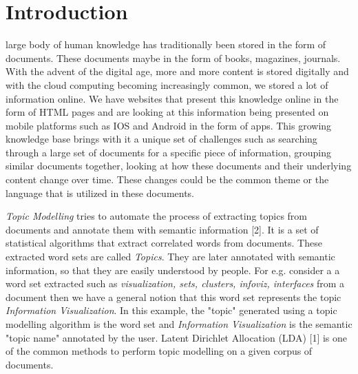 \documentclass[10pt,journal,compsoc]{IEEEtran}
\begin{document}
\ifCLASSOPTIONcompsoc
{}
\else
\section{Introduction}
\label{sec:introduction}
\fi

 large body of human knowledge has traditionally been stored in the form of documents. These documents maybe in the form of books, magazines, journals. With the advent of the digital age, more and more content is stored digitally and with the cloud computing becoming increasingly common, we stored a lot of information online. We have websites that present this knowledge online in the form of HTML pages and are looking at this information being presented on mobile platforms such as IOS and Android in the form of apps. This growing knowledge base brings with it a unique set of challenges such as searching through a large set of documents for a specific piece of information, grouping similar documents together, looking at how these documents and their underlying content change over time. These changes could be the common theme or the language that is utilized in these documents.

\textit{Topic Modelling} tries to automate the process of extracting topics from documents and annotate them with semantic information [2]. It is a set of statistical algorithms that extract correlated words from documents. These extracted word sets are called \textit{Topics}. They are later annotated with semantic information, so that they are easily understood by people. For e.g. consider a a word set extracted such as \textit{visualization, sets, clusters, infoviz, interfaces} from a document then we have a general notion that this word set represents the topic \textit{Information Visualization}. In this example, the "topic" generated using a topic modelling algorithm is the word set and \textit{Information Visualization} is the semantic "topic name" annotated by the user. Latent Dirichlet Allocation (LDA) [1] is one of the common methods to perform topic modelling on a given corpus of documents.
\end{document}
